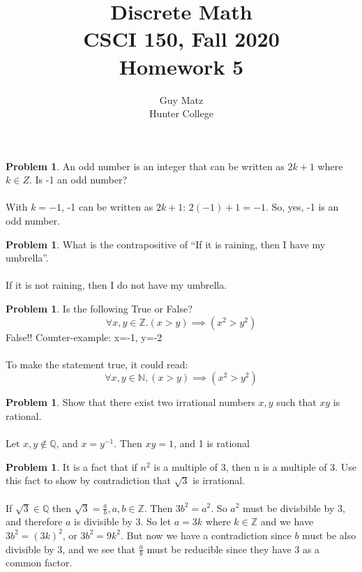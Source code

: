 \documentclass[10pt,leqno ]{article}
\title{Discrete Math\\
CSCI 150, Fall 2020\\
Homework 5}
\author{Guy Matz \\
Hunter College}
\theoremstyle{definition}
\newtheorem{problem}[theorem]{Problem}
\begin{document}
\begin{problem} An odd number is an integer that can be written as $2k + 1$ where $k \in Z$.  Is -1 an odd number?
\\\\
\Large
With $k=-1$, -1 can be written as $2k + 1$: $2(-1) + 1 = -1$.  So, yes, -1 is an odd number.

\end{problem}
\newpage

\begin{problem} What is the contrapositive of “If it is raining, then I have my umbrella”.
\\\\
\Large
If it is not raining, then I do not have my umbrella.
\end{problem}
\newpage

\begin{problem} Is the following True or False?
$$ \forall x, y \in  \mathbb{Z}.(x > y) \implies (x^2 > y^2)$$
\Large
False!!  Counter-example: x=-1, y=-2
\\\\
To make the statement true, it could read:
$$ \forall x, y \in  \mathbb{N}, (x > y) \implies (x^2 > y^2)$$
\end{problem}
\newpage

\begin{problem} Show that there exist two irrational numbers $x, y$ such that $xy$ is rational.
\\\\
\Large
Let $x,y \notin \mathbb{Q}$, and $x = y^{-1}$.  Then $xy = 1$, and 1 is rational
\end{problem}
\newpage

\begin{problem} It is a  fact that if $n^2$ is a multiple of 3, then n is
a multiple of 3. Use this fact to show by contradiction that $\sqrt{3}$  is irrational.
\\\\
\Large
If $\sqrt{3} \in \mathbb{Q}$ then $\sqrt{3} = \frac{a}{b}, a,b \in \mathbb{Z}$.  Then $3b^2 = a^2$.  So $a^2$ must be divisbible by 3, and therefore $a$ is divisible by 3.  So let $a = 3k$ where $k \in \mathbb{Z}$ and we have $3b^2 = (3k)^2$, or $3b^2 = 9k^2$.  But now we have a contradiction since $b$ must be also divisible by 3, and we see that $\frac{a}{b}$ must be reducible since they have 3 as a common factor.  
\end{problem}
\newpage
\end{document}
